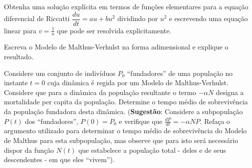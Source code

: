\begin{exercise}
Obtenha uma solução explícita em termos de funções elementares para a equação diferencial de Riccatti \(\dfrac{du}{dt} = au + bu^2\) dividindo por \(u^2\) e escrevendo uma equação linear para \(v = \frac{1}{u}\) que pode ser resolvida explicitamente.
\end{exercise}

\begin{exercise}
Escreva o Modelo de Malthus-Verhulst na forma adimensional e explique o resultado. 
\end{exercise}

\begin{exercise}
Considere um conjunto de indivíduos \(P_0\) ``fundadores'' de uma população no instante \(t=0\) cuja dinâmica é regida por um Modelo de Malthus-Verhulst. Considere que para a dinâmica da população resultante o termo \(-\alpha N\) designa a mortalidade per capita da população. Determine o tempo médio de sobrevivência da população fundadora desta dinâmica. (\textbf{Sugestão}: Considere a subpopulação \(P(t)\) dos ``fundadores'', \(P(0) = P_0\) e verifique que \(\frac{dP}{dt} = -\alpha NP\). Refaça o argumento utilizado para determinar o tempo médio de sobrevivência do Modelo de Malthus para esta subpopulação, mas observe que para isto será necessário dispor da função \(N(t)\) que estabelece a população total - deles e de seus descendentes - em que eles ``vivem'').
\end{exercise}

